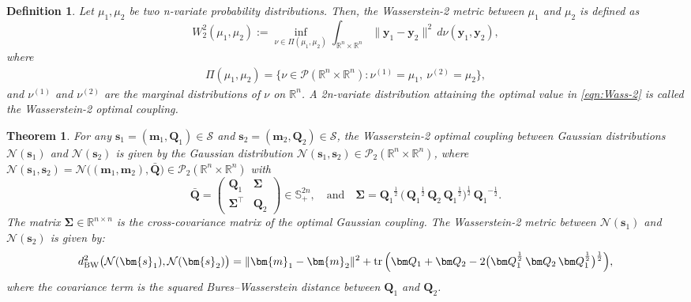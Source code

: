 \documentclass[opre,sglanonrev]{informs4}
\newtheorem{theorem}{Theorem}
\newtheorem{definition}{Definition}
\newcommand{\mS}{\mathcal{S}}
\newcommand{\mN}{\mathcal{N}}
\newcommand{\mP}{\mathcal{P}}
\newcommand{\mbR}{\mathbb R}
\newcommand{\mbS}{\mathbb S}
\newcommand{\bmean}{\bm{m}}
\newcommand{\bs}{\bm{s}}
\newcommand{\by}{\bm{y}}
\newcommand{\bQ}{\bm Q}
\newcommand{\bSigma}{\bm{\Sigma}}
\newcommand{\Tr}{\operatorname{tr}}
\begin{document}
\begin{definition} Let $\mu_1, \mu_2$ be two n-variate probability distributions. Then, the Wasserstein-2 metric between $\mu_1$ and $\mu_2$ is defined as  
\begin{equation}
    W^2_2(\mu_1,\mu_2) :=
  \inf_{\nu \in \Pi(\mu_1, \mu_2)}
    \int_{\mbR^n \times \mbR^n}
      \|\by_1 - \by_2\|^2 \,d\nu(\by_1,\by_2), \label{eqn:Wass-2}
\end{equation}
where
\begin{align}\label{def: coupling-Euclidean}
  \Pi(\mu_1, \mu_2)
  =
  \bigl\{
    \nu \in \mP(\mbR^n \times \mbR^n)
    :
    \nu^{(1)} = \mu_1,\ \nu^{(2)} = \mu_2
  \bigr\},
\end{align}
\noindent and $\nu^{(1)}$ and $\nu^{(2)}$ are the marginal distributions of $\nu$ on $\mbR^n$. A 2n-variate distribution attaining the optimal value in \eqref{eqn:Wass-2} is called the Wasserstein-2 optimal coupling.
\end{definition}

\begin{theorem} \cite{GivensShortt1984, gelbrich1990formula}\label{thm: Gelbrich}
For any $\bs_1=(\bmean_1, \bQ_1) \in \mS$ and $\bs_2=(\bmean_2, \bQ_2) \in \mS$, the Wasserstein-2 optimal coupling between Gaussian distributions $\mN(\bs_1)$ and $\mN(\bs_2)$  is  given by the Gaussian distribution $\mN(\bs_1, \bs_2) \in \mP_2(\mbR^n \times \mbR^n)$, where
     $ \mN(\bs_1, \bs_2)= \mN\!\bigl((\bmean_1,\bmean_2),\bar{\bQ}\bigr) \in \mP_2(\mbR^n \times \mbR^n)$ with 
     \begin{equation}\label{def: gelbrich-off-diagonal}
      \bar{\bQ}=\begin{pmatrix}\bQ_{1}&\bSigma\\ \bSigma^\top &\bQ_{2}\end{pmatrix}\in\mbS^{2n}_+,    \quad \text{and} \quad  
\bSigma = {\bQ_1}^{\frac12}\,\bigl(\,{\bQ_1}^{\frac12}\,{\bQ_2}\,{\bQ_1}^{\frac12}\bigr)^{\frac12}\,{\bQ_1}^{-\frac12}.
     \end{equation}
The matrix $\bSigma\in\mbR^{n\times n}$ is the cross-covariance matrix of the optimal Gaussian coupling.
The Wasserstein-2 metric between $\mN(\bs_1)$ and $\mN(\bs_2)$ is given by:
\begin{equation}\label{def: distance-matric}
d^2_{\mathrm{BW}}\bigl(\mN(\bs_1),\mN(\bs_2)\bigr)
=
\|\bmean_1-\bmean_2\|^2
+\Tr \,\Bigl(
\bQ_1+\bQ_2
-2\bigl(\bQ_1^{\frac12}\,\bQ_2\,\bQ_1^{\frac12}\bigr)^{\frac12}
\Bigr),
\end{equation}
where the covariance term is the squared Bures--Wasserstein distance between
$\bQ_1$ and $\bQ_2$.
\end{theorem}
\end{document}
